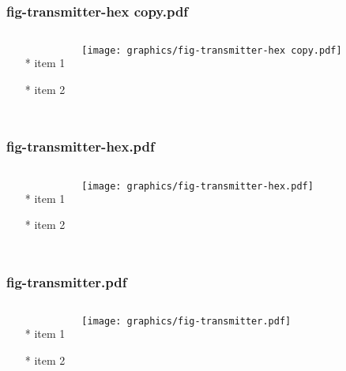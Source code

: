 \documentclass{beamer}
\begin{document}
\begin{frame} \frametitle{fig-transmitter-hex copy.pdf}
    \begin{columns}[c]
        \begin{itemize}
            \item[*] item 1
            \item[*] item 2
        \end{itemize}
        \begin{minipage}{\linewidth}
            \begin{center}
            \texttt{[image: graphics/fig-transmitter-hex copy.pdf]}
            \label{gfx:fig-transmitter-hex copy.pdf}
            \end{center}
        \end{minipage}
    \end{columns}
\end{frame}
\begin{frame} \frametitle{fig-transmitter-hex.pdf}
    \begin{columns}[c]
        \begin{itemize}
            \item[*] item 1
            \item[*] item 2
        \end{itemize}
        \begin{minipage}{\linewidth}
            \begin{center}
            \texttt{[image: graphics/fig-transmitter-hex.pdf]}
            \label{gfx:fig-transmitter-hex.pdf}
            \end{center}
        \end{minipage}
    \end{columns}
\end{frame}
\begin{frame} \frametitle{fig-transmitter.pdf}
    \begin{columns}[c]
        \begin{itemize}
            \item[*] item 1
            \item[*] item 2
        \end{itemize}
        \begin{minipage}{\linewidth}
            \begin{center}
            \texttt{[image: graphics/fig-transmitter.pdf]}
            \label{gfx:fig-transmitter.pdf}
            \end{center}
        \end{minipage}
    \end{columns}
\end{frame}
\end{document}
